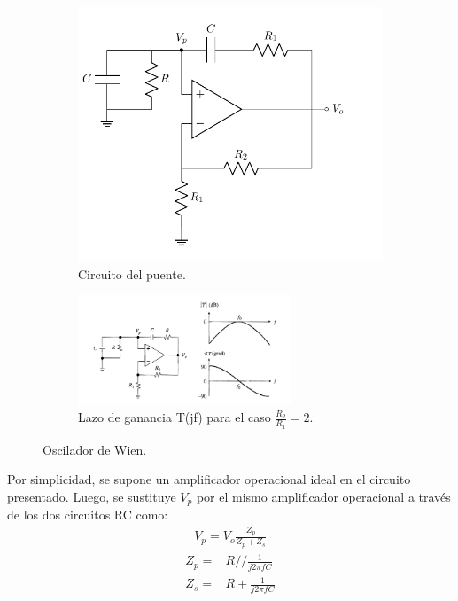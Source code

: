 \begin{figure}[H]
\centering
\begin{subfigure}{.49\textwidth}
\centering
	\includegraphics[width=\textwidth, page=1]{Imagenes-Ej1/Circuitos1.pdf}
	\caption{Circuito del puente.}
	\label{fig:wienbasico1}
\end{subfigure}
\begin{subfigure}{.49\textwidth}
\centering
	\includegraphics[width=0.7\textwidth,trim={9.5cm 0 0 0},clip]{Imagenes-Ej1/102.png}
	\caption{Lazo de ganancia T(jf) para el caso $\frac{R_2}{R_1} =2$. }
	\label{fig:wienbasico2}
\end{subfigure}
\caption{Oscilador de Wien.}
\label{fig:wienbasico}
\end{figure}

Por simplicidad, se supone un amplificador operacional ideal en el circuito presentado. Luego, se sustituye $V_p$ por el mismo amplificador operacional a través de los dos circuitos RC como:
\begin{align}
V_p= V_o \frac{Z_p}{Z_p+Z_s}
\end{align}
\begin{equation}
\begin{split}
	Z_p = & R // \frac{1}{j2\pi f C} \\
	Z_s = & R + \frac{1}{j2\pi f C} 
\end{split}
\end{equation}

